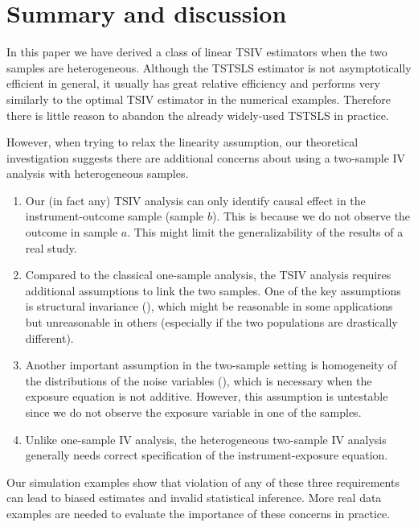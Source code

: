 \documentclass[preprint]{imsart}
\begin{document}
\section{Summary and discussion}
\label{sec:summary-discussion}

In this paper we have derived a class of linear TSIV estimators when the two
samples are heterogeneous. Although the TSTSLS estimator is not
asymptotically efficient in general, it usually has great relative
efficiency and performs very similarly to the optimal TSIV estimator
in the numerical examples. Therefore there is little reason to abandon
the already widely-used TSTSLS in practice.

However, when trying to relax the linearity assumption, our
theoretical investigation suggests there are additional concerns about
using a two-sample IV analysis with heterogeneous samples.
\begin{enumerate}
\item Our (in fact any) TSIV analysis can only identify causal effect
  in the instrument-outcome sample (sample $b$). This is because we do
  not observe the outcome in sample $a$. This might limit the
  generalizability of the results of a real study.
\item Compared to the classical one-sample analysis, the TSIV analysis
  requires additional assumptions to link the two samples. One of the
  key assumptions is structural invariance (),
  which might be reasonable in some applications but unreasonable in
  others (especially if the two populations are drastically different).
\item Another important assumption in the two-sample setting is
  homogeneity of the distributions of the noise variables
  (), which is necessary when the
  exposure equation is not additive. However, this assumption is
  untestable since we do not observe the exposure variable in one of
  the samples.
\item Unlike one-sample IV analysis, the heterogeneous two-sample IV
  analysis generally needs correct specification of the
  instrument-exposure equation.
\end{enumerate}
Our simulation examples show that violation of any of these three
requirements can lead to biased estimates and invalid statistical
inference. More real data examples are needed to evaluate the
importance of these concerns in practice.
\end{document}
